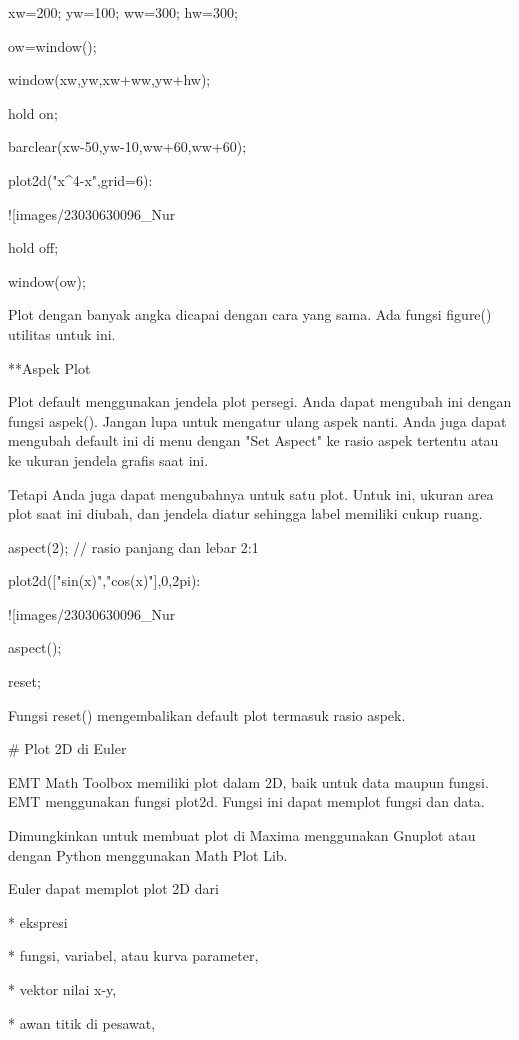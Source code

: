 \documentclass{article}
\begin{document}
\>xw=200; yw=100; ww=300; hw=300;

\>ow=window();

\>window(xw,yw,xw+ww,yw+hw);

\>hold on;

\>barclear(xw-50,yw-10,ww+60,ww+60);

\>plot2d("x^4-x",grid=6):


![images/23030630096_Nur%

\>hold off;

\>window(ow);


Plot dengan banyak angka dicapai dengan cara yang sama. Ada fungsi
figure() utilitas untuk ini.


**Aspek Plot


Plot default menggunakan jendela plot persegi. Anda dapat mengubah ini
dengan fungsi aspek(). Jangan lupa untuk mengatur ulang aspek nanti.
Anda juga dapat mengubah default ini di menu dengan "Set Aspect" ke
rasio aspek tertentu atau ke ukuran jendela grafis saat ini.


Tetapi Anda juga dapat mengubahnya untuk satu plot. Untuk ini, ukuran
area plot saat ini diubah, dan jendela diatur sehingga label memiliki
cukup ruang.


\>aspect(2); // rasio panjang dan lebar 2:1

\>plot2d(["sin(x)","cos(x)"],0,2pi):


![images/23030630096_Nur%

\>aspect();

\>reset;


Fungsi reset() mengembalikan default plot termasuk rasio aspek.


# Plot 2D di Euler

EMT Math Toolbox memiliki plot dalam 2D, baik untuk data maupun
fungsi. EMT menggunakan fungsi plot2d. Fungsi ini dapat memplot fungsi
dan data.


Dimungkinkan untuk membuat plot di Maxima menggunakan Gnuplot atau
dengan Python menggunakan Math Plot Lib.


Euler dapat memplot plot 2D dari


* 
ekspresi

* 
fungsi, variabel, atau kurva parameter,

* 
vektor nilai x-y,

* 
awan titik di pesawat,
\end{document}
